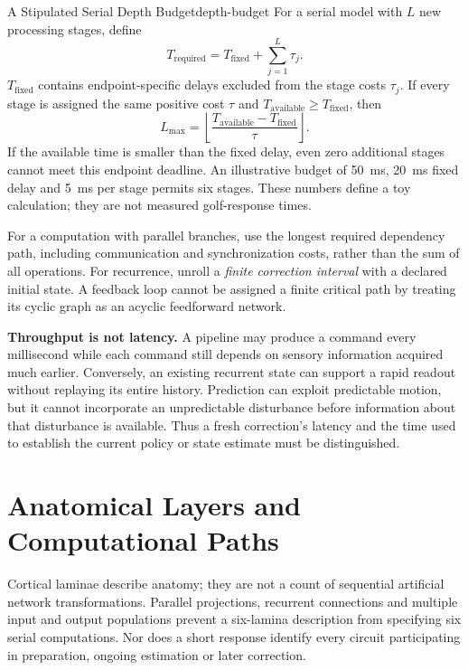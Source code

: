 \begin{definition}{A Stipulated Serial Depth Budget}{depth-budget}
For a serial model with $L$ new processing stages, define
\begin{equation}
 T_{\mathrm{required}}=T_{\mathrm{fixed}}+\sum_{j=1}^{L}\tau_j.
 \label{eq:ch4:depth-budget}
\end{equation}
$T_{\mathrm{fixed}}$ contains endpoint-specific delays excluded from the stage
costs $\tau_j$. If every stage is assigned the same positive cost $\tau$ and
$T_{\mathrm{available}}\geq T_{\mathrm{fixed}}$, then
\[
 L_{\max}=\left\lfloor
 \frac{T_{\mathrm{available}}-T_{\mathrm{fixed}}}{\tau}
 \right\rfloor.
\]
If the available time is smaller than the fixed delay, even zero additional
stages cannot meet this endpoint deadline. An illustrative budget of 50~ms,
20~ms fixed delay and 5~ms per stage permits six stages. These numbers define
a toy calculation; they are not measured golf-response times.
\end{definition}

For a computation with parallel branches, use the longest required dependency
path, including communication and synchronization costs, rather than the sum
of all operations. For recurrence, unroll a \emph{finite correction interval}
with a declared initial state. A feedback loop cannot be assigned a finite
critical path by treating its cyclic graph as an acyclic feedforward network.

\textbf{Throughput is not latency.} A pipeline may produce a command every
millisecond while each command still depends on sensory information acquired
much earlier. Conversely, an existing recurrent state can support a rapid
readout without replaying its entire history. Prediction can exploit predictable
motion, but it cannot incorporate an unpredictable disturbance before information
about that disturbance is available. Thus a fresh correction's latency and the
time used to establish the current policy or state estimate must be distinguished.

\section{Anatomical Layers and Computational Paths}

Cortical laminae describe anatomy; they are not a count of sequential artificial
network transformations. Parallel projections, recurrent connections and multiple
input and output populations prevent a six-lamina description from specifying
six serial computations. Nor does a short response identify every circuit
participating in preparation, ongoing estimation or later correction.

